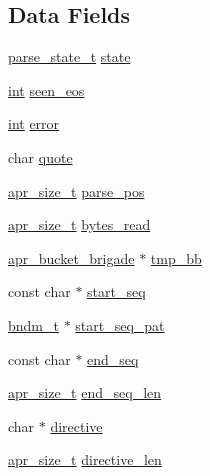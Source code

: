 \subsection*{Data Fields}
\begin{DoxyCompactItemize}
\item 
\hyperlink{mod__include_8c_a121fcd1f39199ee9735ef9410eb97a0e}{parse\+\_\+state\+\_\+t} \hyperlink{structssi__internal__ctx_a3eebdb88ceb5ae56f2446bbb2685324d}{state}
\item 
\hyperlink{pcre_8txt_a42dfa4ff673c82d8efe7144098fbc198}{int} \hyperlink{structssi__internal__ctx_a282747a710a7fc8a29c138bb2d24e552}{seen\+\_\+eos}
\item 
\hyperlink{pcre_8txt_a42dfa4ff673c82d8efe7144098fbc198}{int} \hyperlink{structssi__internal__ctx_a28b6b968d956bc83af5dee859894f356}{error}
\item 
char \hyperlink{structssi__internal__ctx_ae11e8a13bf7e9f9bd07da9bfe62d4816}{quote}
\item 
\hyperlink{group__apr__platform_gaaa72b2253f6f3032cefea5712a27540e}{apr\+\_\+size\+\_\+t} \hyperlink{structssi__internal__ctx_a4a0d2a92d535c0cde0c81eeff646a9a6}{parse\+\_\+pos}
\item 
\hyperlink{group__apr__platform_gaaa72b2253f6f3032cefea5712a27540e}{apr\+\_\+size\+\_\+t} \hyperlink{structssi__internal__ctx_a07de5a62f33b8d5ebdb4f8cefcc7b9b4}{bytes\+\_\+read}
\item 
\hyperlink{structapr__bucket__brigade}{apr\+\_\+bucket\+\_\+brigade} $\ast$ \hyperlink{structssi__internal__ctx_acbfa5e6a3dc6ee1e887978007d9c0a97}{tmp\+\_\+bb}
\item 
const char $\ast$ \hyperlink{structssi__internal__ctx_a4c1c5cff45778d707436c572f24e900f}{start\+\_\+seq}
\item 
\hyperlink{structbndm__t}{bndm\+\_\+t} $\ast$ \hyperlink{structssi__internal__ctx_a79e6bba2cd1d1b6e0e43b34409c0c0c5}{start\+\_\+seq\+\_\+pat}
\item 
const char $\ast$ \hyperlink{structssi__internal__ctx_ab152fd4d96710564a5cfb609fc822ab9}{end\+\_\+seq}
\item 
\hyperlink{group__apr__platform_gaaa72b2253f6f3032cefea5712a27540e}{apr\+\_\+size\+\_\+t} \hyperlink{structssi__internal__ctx_a38f765f12be6fe94709de9bf06af570b}{end\+\_\+seq\+\_\+len}
\item 
char $\ast$ \hyperlink{structssi__internal__ctx_ad0219b77838cebab58a2fb1780a1ee27}{directive}
\item 
\hyperlink{group__apr__platform_gaaa72b2253f6f3032cefea5712a27540e}{apr\+\_\+size\+\_\+t} \hyperlink{structssi__internal__ctx_aa0430a38168bf9d4d65b811b02b4585f}{directive\+\_\+len}

\end{DoxyCompactItemize}
